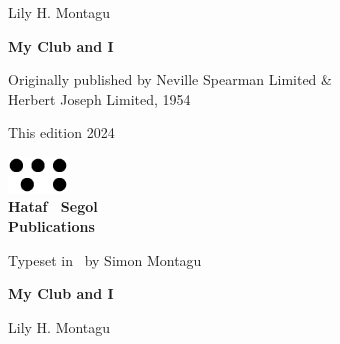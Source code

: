 \frontmatter
\pagestyle{empty}

\vspace*{2\baselineskip}
\begin{center}
  Lily H. Montagu

  \vspace*{2\baselineskip}
  \textbf{My Club and I}
\end{center}

\clearpage

\begin{center}
  \vspace{2\baselineskip}
  
  \small Originally published by Neville Spearman Limited \&\\
  Herbert Joseph Limited, 1954

  This edition 2024
  \vspace*{22\baselineskip}

  \includegraphics[width=16mm]{hatafSegolLogoNoText.png}\\
  
  {
    \Large\bfseries Hataf \ Segol\\Publications
  }

  \vspace{1\baselineskip}
  \small
  Typeset in \XeLaTeX\ by Simon Montagu
  \end{center}

\clearpage
 
{
  \vspace*{4\baselineskip}

  \centering\LARGE\bfseries My Club and I

  \vspace{2\baselineskip}

  \Large Lily H. Montagu
  
}

\cleardoublepage
\tableofcontents*

